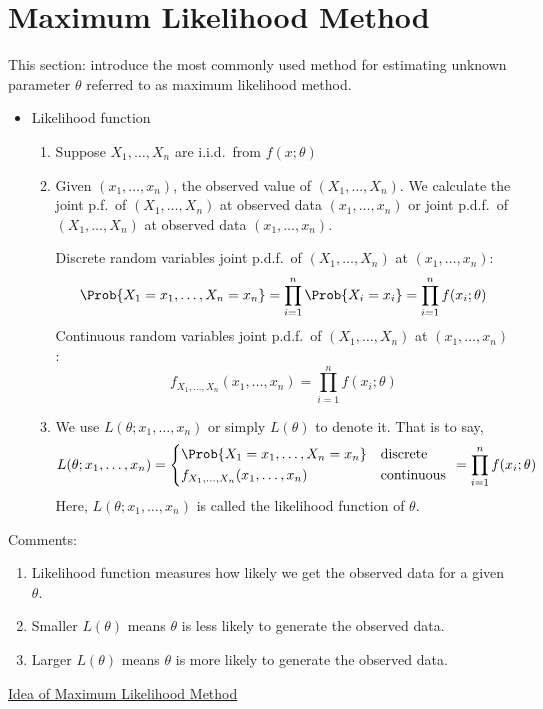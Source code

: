 \section{Maximum Likelihood Method}
This section: introduce the most commonly used method for estimating unknown
parameter $ \theta $ referred to as maximum likelihood method.
\begin{itemize}
    \item Likelihood function
          \begin{enumerate}
              \item Suppose $ X_1,\ldots,X_n $ are i.i.d.\ from $ f(x;\theta) $
              \item Given $ (x_1,\ldots,x_n) $, the observed value of $ (X_1,\ldots,X_n) $.
                    We calculate the joint p.f.\ of $ (X_1,\ldots,X_n) $ at observed
                    data $ (x_1,\ldots,x_n) $ or joint p.d.f.\ of $ (X_1,\ldots,X_n) $
                    at observed data $ (x_1,\ldots,x_n) $.

                    Discrete random variables joint p.d.f.\ of $ (X_1,\ldots,X_n) $
                    at $ (x_1,\ldots,x_n) $:
                    \[ \Prob{X_1=x_1,\ldots,X_n=x_n}=
                        \prod_{i=1}^n \Prob{X_i=x_i}=
                        \prod_{i=1}^n f(x_i;\theta) \]
                    Continuous random variables joint p.d.f.\ of $ (X_1,\ldots,X_n) $
                    at $ (x_1,\ldots,x_n) $:
                    \[ f_{X_1,\ldots,X_n}(x_1,\ldots,x_n)=
                        \prod_{i=1}^n f(x_i;\theta) \]
              \item We use $ L(\theta;x_1,\ldots,x_n) $ or simply
                    $ L(\theta) $ to denote it. That is to say,
                    \[ L(\theta;x_1,\ldots,x_n)=
                        \begin{cases*}
                            \Prob{X_1=x_1,\ldots,X_n=x_n}      & discrete   \\
                            f_{X_1,\ldots,X_n}(x_1,\ldots,x_n) & continuous
                        \end{cases*}=\prod_{i=1}^n f(x_i;\theta) \]
                    Here, $ L(\theta;x_1,\ldots,x_n) $ is called the likelihood function
                    of $ \theta $.
          \end{enumerate}
\end{itemize}
Comments:
\begin{enumerate}
    \item Likelihood function measures how likely we get
          the observed data for a given $ \theta $.
    \item Smaller $ L(\theta) $ means $ \theta $ is less likely
          to generate the observed data.
    \item Larger $ L(\theta) $ means $ \theta $ is more likely
          to generate the observed data.
\end{enumerate}
\underline{Idea of Maximum Likelihood Method}

